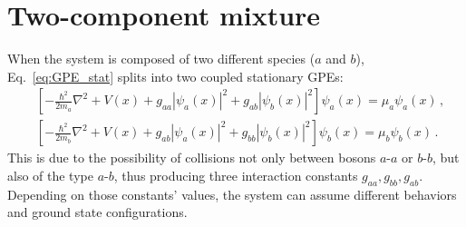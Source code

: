 \section{Two-component mixture}
When the system is composed of two different species ($a$ and $b$), Eq.\ \eqref{eq:GPE_stat} splits into two coupled stationary GPEs:
\begin{equation}
    \begin{aligned}
        &\left[ -\frac{\hbar^2}{2m_a}\nabla^2 + V(x) + g_{aa}|\psi_a(x)|^2 + g_{ab}|\psi_b(x)|^2
        \right] \psi_a(x) = \mu_a \psi_a(x)\, , \\
        &\left[ -\frac{\hbar^2}{2m_b}\nabla^2 + V(x) + g_{ab}|\psi_a(x)|^2 + g_{bb}|\psi_b(x)|^2
        \right] \psi_b(x) = \mu_b \psi_b(x)\, .
    \end{aligned}
    \label{eq:GPE_two}
\end{equation}
This is due to the possibility of collisions not only between bosons $a$-$a$ or $b$-$b$, but also of the type $a$-$b$, thus producing three interaction constants $g_{aa}, g_{bb}, g_{ab}$. Depending on those constants' values, the system can assume different behaviors and ground state configurations. 


